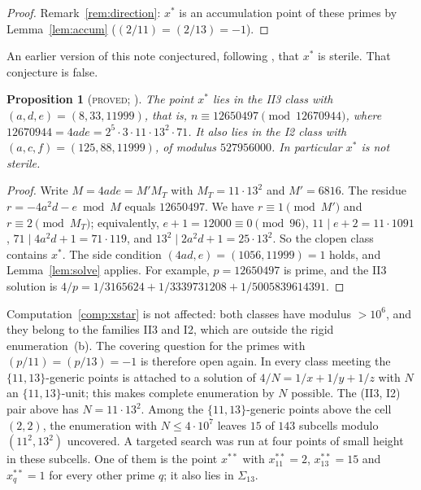 \documentclass[11pt,reqno]{amsart}
\newtheorem{proposition}[theorem]{Proposition}
\theoremstyle{definition}
\newcommand{\status}[1]{\textup{\textsc{#1}}}
\begin{document}
\begin{proof}
Remark~\ref{rem:direction}: $x^*$ is an accumulation point of these
primes by Lemma~\ref{lem:accum} ($(2/11)=(2/13)=-1$).
\end{proof}

An earlier version of this note conjectured, following
\cite[Conj.~4.2]{PM}, that $x^*$ is sterile.  That conjecture is false.

\begin{proposition}[\status{proved}; {\cite[Thm.~3.1]{PM13B}}]\label{prop:xstarcovered}
The point $x^*$ lies in the II3 class with $(a,d,e)=(8,33,11999)$, that
is, $n\equiv12650497\pmod{12670944}$, where
$12670944=4ade=2^5\cdot3\cdot11\cdot13^2\cdot71$.  It also lies in the I2
class with $(a,c,f)=(125,88,11999)$, of modulus $527956000$.  In
particular $x^*$ is not sterile.
\end{proposition}

\begin{proof}
Write $M=4ade=M'M_T$ with $M_T=11\cdot13^2$ and $M'=6816$.  The residue
$r=-4a^2d-e\bmod M$ equals $12650497$.  We have $r\equiv1\pmod{M'}$ and
$r\equiv2\pmod{M_T}$; equivalently, $e+1=12000\equiv0\pmod{96}$,
$11\mid e+2=11\cdot1091$, $71\mid 4a^2d+1=71\cdot119$, and
$13^2\mid 2a^2d+1=25\cdot13^2$.  So the clopen class contains $x^*$.  The
side condition $(4ad,e)=(1056,11999)=1$ holds, and
Lemma~\ref{lem:solve} applies.  For example, $p=12650497$ is prime, and
the II3 solution is $4/p=1/3165624+1/3339731208+1/5005839614391$.
\end{proof}

Computation~\ref{comp:xstar} is not affected: both classes have modulus
$>10^6$, and they belong to the families II3 and I2, which are outside
the rigid enumeration~(b).  The covering question for the primes with
$(p/11)=(p/13)=-1$ is therefore open again.  In \cite{PM13B} every class
meeting the $\{11,13\}$-generic points is attached to a solution of
$4/N=1/x+1/y+1/z$ with $N$ an $\{11,13\}$-unit; this makes complete
enumeration by $N$ possible.  The (II3, I2) pair above has $N=11\cdot13^2$.
Among the $\{11,13\}$-generic points above the cell $(2,2)$, the
enumeration with $N\le4\cdot10^7$ leaves $15$ of $143$ subcells modulo
$(11^2,13^2)$ uncovered.  A targeted search was run at four points of
small height in these subcells.  One of them is the point
$x^{**}$ with $x^{**}_{11}=2$, $x^{**}_{13}=15$ and $x^{**}_q=1$ for
every other prime $q$; it also lies in $\Sigma_{13}$.
\end{document}
